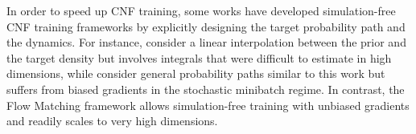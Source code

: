 \documentclass{article}
\begin{document}
In order to speed up CNF training, some works have developed simulation-free CNF training frameworks by explicitly designing the target probability path and the dynamics. For instance, \citet{rozen2021moser} consider a linear interpolation between the prior and the target density but involves integrals that were difficult to estimate in high dimensions, while \citet{ben2022matching} consider general probability paths similar to this work but suffers from biased gradients in the stochastic minibatch regime.
In contrast, the Flow Matching framework allows simulation-free training with unbiased gradients and readily scales to very high dimensions.


\end{document}
